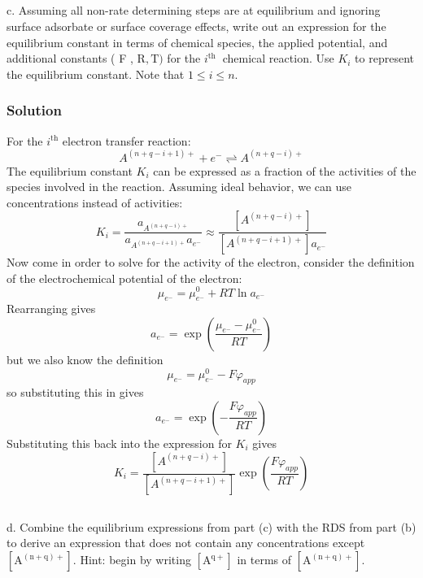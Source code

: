\documentclass[12pt]{article}
\begin{document}
\subsection{}
c. Assuming all non-rate determining steps are at equilibrium and ignoring surface adsorbate or surface coverage effects, write out an expression for the equilibrium constant in terms of chemical species, the applied potential, and additional constants ( F , $\mathrm{R}, \mathrm{T})$ for the $i^{\text {th }}$ chemical reaction. Use $K_{i}$ to represent the equilibrium constant. Note that $1 \leq i \leq n$.\\
\subsubsection{Solution}
For the $i^{\text{th}}$ electron transfer reaction:
\begin{equation}
A^{(n+q-i+1)+} + e^- \rightleftharpoons A^{(n+q-i)+}
\end{equation}
The equilibrium constant $K_i$ can be expressed as a fraction of the activities of the species involved in the reaction. Assuming ideal behavior, we can use concentrations instead of activities:
\begin{equation}
K_i = \frac{a_{A^{(n+q-i)+}}}{a_{A^{(n+q-i+1)+}} a_{e^-}} \approx \frac{[A^{(n+q-i)+}]}{[A^{(n+q-i+1)+}]a_{e^-}}
\end{equation}
Now come in order to solve for the activity of the electron, consider the definition of the electrochemical potential of the electron:
\begin{equation}
\mu_{e^-} = \mu_{e^-}^0 + RT \ln a_{e^-}
\end{equation}
Rearranging gives
\begin{equation}
a_{e^-} = \exp \left( \frac{\mu_{e^-} - \mu_{e^-}^0}{RT} \right)
\end{equation}
but we also know the definition
\begin{equation}
\mu_{e^-} = \mu_{e^-}^0 - F \varphi_{app}
\end{equation}
so substituting this in gives
\begin{equation}
a_{e^-} = \exp \left( -\frac{F \varphi_{app}}{RT} \right)
\end{equation}
Substituting this back into the expression for $K_i$ gives
\begin{equation}
K_i = \frac{[A^{(n+q-i)+}]}{[A^{(n+q-i+1)+}]} \exp \left( \frac{F \varphi_{app}}{RT} \right)
\end{equation}
\subsection{}
d. Combine the equilibrium expressions from part (c) with the RDS from part (b) to derive an expression that does not contain any concentrations except $\left[\mathrm{A}^{(\mathrm{n}+\mathrm{q})+}\right]$. Hint: begin by writing $\left[\mathrm{A}^{\mathrm{q}+}\right]$ in terms of $\left[\mathrm{A}^{(\mathrm{n}+\mathrm{q})+}\right]$.\\
\end{document}
